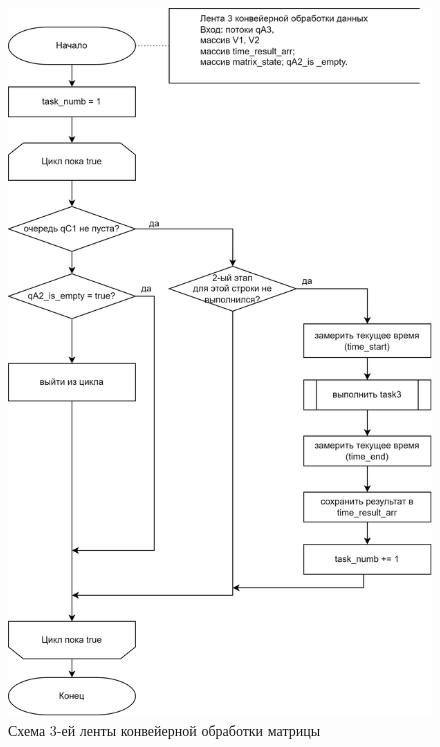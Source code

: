 \clearpage

\begin{figure}[h]
	\centering
	\includegraphics[scale=0.2]{img/parallel_stage_3.png}
	\caption{Схема 3-ей ленты конвейерной обработки матрицы}
	\label{fig:parallel_stage_3}
\end{figure} 

\clearpage

